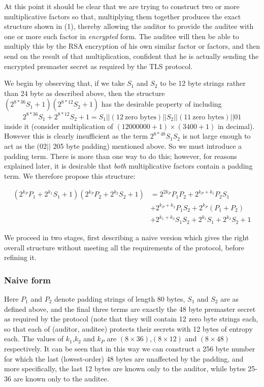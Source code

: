 \documentclass[10pt,a4paper]{article}
\begin{document}
\noindent At this point it should be clear that we are trying to construct two or more multiplicative factors so that, multiplying them together produces the exact structure shown in (1), thereby allowing the auditor to provide the auditee with one or more such factor in \textit{encrypted} form. The auditee will then be able to multiply this by the RSA encryption of his own similar factor or factors, and then send on the result of that multiplication, confident that he is actually sending the encrypted premaster secret as required by the TLS protocol.

\pagebreak

\noindent We begin by observing that, if we take $S_1$ and $S_2$ to be 12 byte strings rather than 24 byte as described above, then  the structure $(2^{8*36}S_1+1)(2^{8*12}S_2+1)$ has the desirable property of including 
\begin{equation*}
2^{8*36}S_1+2^{8*12}S_2+1=S_1||(12\ \textrm{zero bytes}) || S_2 ||( 11\ \textrm{zero bytes}) || 01
\end{equation*}
\noindent inside it (consider multiplication of $(12000000+1) \times (3400+1)$ in decimal). However this is clearly insufficient as the term $2^{8*48}S_1S_2$ is not large enough to act as the ($02||$ 205 byte padding) mentioned above. So we must introduce a padding term. There is  more than one way to do this; however, for reasons explained later, it is desirable that \emph{both} multiplicative factors contain a padding term. We therefore propose this structure:

\begin{equation}\label{expanded}
\begin{split}
(2^{k_P}P_1+2^{k_1}S_1+1)(2^{k_P}P_2+2^{k_2}S_2+1) &= 2^{2k_P} P_1 P_2 + 2^{k_P+k_1}P_2S_1 \\
					&+2^{k_P+k_2}P_1S_2 + 2^{k_P}(P_1+P_2) \\
					&+ 2^{k_1+k_2}S_1S_2 +2^{k_1}S_1+2^{k_2}S_2+1
\end{split}
\end{equation}

\noindent We proceed in two stages, first describing a naive version which gives the right overall structure without meeting all the requirements of the protocol, before refining it.

\subsubsection{Naive form}
\noindent Here $P_1$ and $P_2$ denote padding strings of length 80 bytes, $S_1$ and $S_2$ are as defined above, and the final three terms are exactly the 48 byte premaster secret as required by the protocol (note that they will contain 12 zero byte strings each, so that each of (auditor, auditee) protects their secrets with 12 bytes of entropy each. The values of $k_1$,$k_2$ and $k_P$ are $(8 \times 36)$,$(8 \times 12)$ and $(8 \times 48)$ respectively. It can be seen that in this way we can construct a 256 byte number for which the last (lowest-order) 48 bytes are unaffected by the padding, and more specifically, the last 12 bytes are known only to the auditor, while bytes 25-36 are known only to the auditee. 
\end{document}
